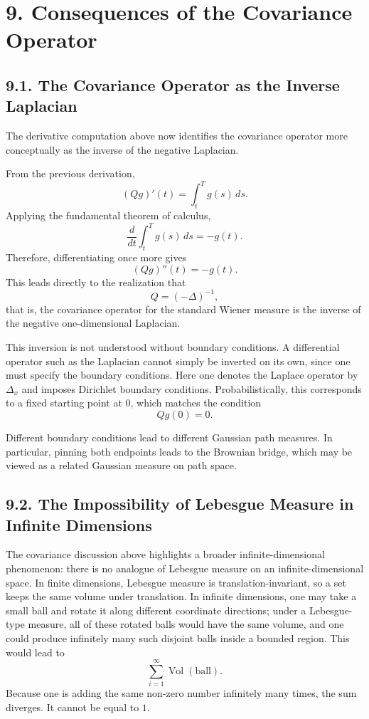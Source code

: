 \documentclass[11pt]{article}
\theoremstyle{definition}
\theoremstyle{remark}
\begin{document}
\section*{9. Consequences of the Covariance Operator}

\subsection*{9.1. The Covariance Operator as the Inverse Laplacian}
The derivative computation above now identifies the covariance operator more conceptually as the inverse of the negative Laplacian.

From the previous derivation,
\[
(Qg)'(t)=\int_t^T g(s)\,ds.
\]
Applying the fundamental theorem of calculus,
\[
\frac{d}{dt}\int_t^T g(s)\,ds=-g(t).
\]
Therefore, differentiating once more gives
\[
(Qg)''(t)=-g(t).
\]
This leads directly to the realization that
\[
Q=(-\Delta)^{-1},
\]
that is, the covariance operator for the standard Wiener measure is the inverse of the negative one-dimensional Laplacian.

This inversion is not understood without boundary conditions. A differential operator such as the Laplacian cannot simply be inverted on its own, since one must specify the boundary conditions. Here one denotes the Laplace operator by $\Delta_x$ and imposes Dirichlet boundary conditions. Probabilistically, this corresponds to a fixed starting point at $0$, which matches the condition
\[
Qg(0)=0.
\]

Different boundary conditions lead to different Gaussian path measures. In particular, pinning both endpoints leads to the Brownian bridge, which may be viewed as a related Gaussian measure on path space.

\subsection*{9.2. The Impossibility of Lebesgue Measure in Infinite Dimensions}
The covariance discussion above highlights a broader infinite-dimensional phenomenon: there is no analogue of Lebesgue measure on an infinite-dimensional space. In finite dimensions, Lebesgue measure is translation-invariant, so a set keeps the same volume under translation. In infinite dimensions, one may take a small ball and rotate it along different coordinate directions; under a Lebesgue-type measure, all of these rotated balls would have the same volume, and one could produce infinitely many such disjoint balls inside a bounded region. This would lead to
\[
\sum_{i=1}^{\infty} \operatorname{Vol}(\text{ball}).
\]
Because one is adding the same non-zero number infinitely many times, the sum diverges. It cannot be equal to $1$.
\end{document}
